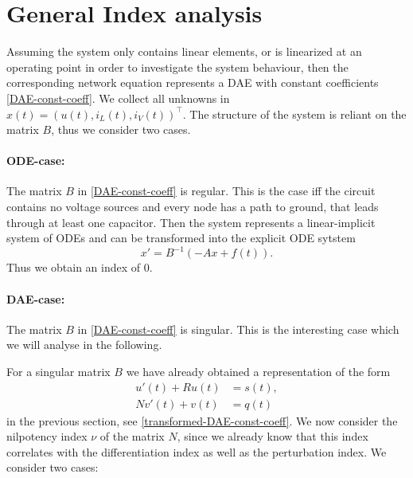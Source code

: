 \section{General Index analysis}

Assuming the system only contains linear elements, or is linearized at an operating point in order to investigate the system behaviour, then the corresponding network equation represents a DAE with constant coefficients \eqref{DAE-const-coeff}. We collect all unknowns in $x(t)=(u(t), i_L(t), i_V(t))^\top$. The structure of the system is reliant on the matrix $B$, thus we consider two cases.

\paragraph{ODE-case:}
	The matrix $B$ in \eqref{DAE-const-coeff} is regular. This is the case iff the circuit contains no voltage sources and every node has a path to ground, that leads through at least one capacitor. Then the system represents a linear-implicit system of ODEs and can be transformed into the explicit ODE sytstem
	\begin{displaymath}
		x'=B^{-1}(-Ax+f(t)).
	\end{displaymath}
	Thus we obtain an index of $0$.
		
\paragraph{DAE-case:}
	The matrix $B$  in \eqref{DAE-const-coeff} is singular. This is the interesting case which we will analyse in the following.


For a singular matrix $B$ we have already obtained a representation of the form
\begin{align*}
	u'(t) + Ru(t) &= s(t), \\
	Nv'(t) + v(t) &= q(t)
\end{align*}
in the previous section, see \eqref{transformed-DAE-const-coeff}. We now consider the nilpotency index $\nu$ of the matrix $N$, since we already know that this index correlates with the differentiation index as well as the perturbation index. We consider two cases:

